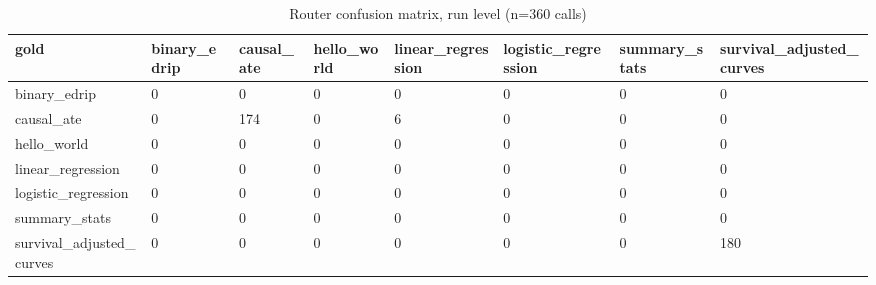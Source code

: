 \begin{table}[ht]
\centering
\caption{Router confusion matrix, run level (n=360 calls)}
\label{tab:router_confusion_matrix_run_level}
\begin{tabular}{llllllll}
\toprule
gold & binary\_edrip & causal\_ate & hello\_world & linear\_regression & logistic\_regression & summary\_stats & survival\_adjusted\_curves \\
\midrule
binary\_edrip & 0 & 0 & 0 & 0 & 0 & 0 & 0 \\
causal\_ate & 0 & 174 & 0 & 6 & 0 & 0 & 0 \\
hello\_world & 0 & 0 & 0 & 0 & 0 & 0 & 0 \\
linear\_regression & 0 & 0 & 0 & 0 & 0 & 0 & 0 \\
logistic\_regression & 0 & 0 & 0 & 0 & 0 & 0 & 0 \\
summary\_stats & 0 & 0 & 0 & 0 & 0 & 0 & 0 \\
survival\_adjusted\_curves & 0 & 0 & 0 & 0 & 0 & 0 & 180 \\
\bottomrule
\end{tabular}
\end{table}
